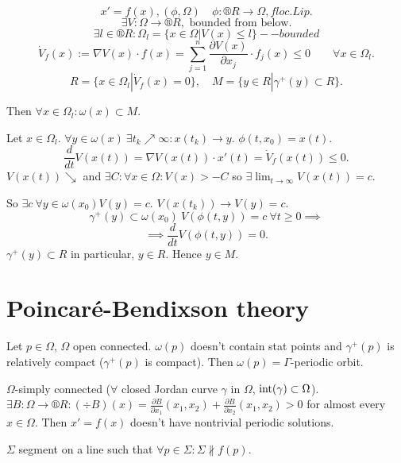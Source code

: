 \documentclass[12pt]{article}					%
\begin{document}
\begin{veta}
	$$ x' = f(x), (\phi, \Omega) \quad \phi: ®R \rightarrow \Omega, f loc. Lip. $$
	$$ \exists V: \Omega \rightarrow ®R, \text{ bounded from below}. $$
	$$ \exists l \in ®R: \Omega_l = \{x \in \Omega | V(x) ≤ l\} -- bounded $$
	$$ \dot{V}_f(x) := \nabla V(x) · f(x) = \sum_{j=1}^n  \frac{\partial V(x)}{\partial x_j}·f_j(x) ≤ 0 \qquad \forall x \in \Omega_l. $$
	$$ R = \{x \in \Omega_l | \dot{V}_f(x) = 0\}, \quad M = \{y \in R | \gamma^+(y) \subset R\}. $$

	Then $\forall x \in \Omega_l: \omega(x) \subset M$.

	\begin{dukazin}
		Let $x \in \Omega_l$. $\forall y \in \omega(x)\ \exists t_k \nearrow ∞: x(t_k) \rightarrow y$. $\phi(t, x_0) = x(t)$.
		$$ \frac{d}{dt} V(x(t)) = \nabla V(x(t))·x'(t) = \dot{V}_f(x(t)) ≤ 0. $$
		$V(x(t)) \searrow$ and $\exists C: \forall x \in \Omega: V(x) > -C$ so $\exists \lim_{t \rightarrow ∞} V(x(t)) = c$.

		So $\exists c\ \forall y \in \omega(x_0) V(y) = c$. $V(x(t_k)) \rightarrow V(y) = c$.
		$$ \gamma^+(y) \subset \omega(x_0)\ V(\phi(t, y)) = c\ \forall t ≥ 0 \implies $$
		$$ \implies \frac{d}{dt}V(\phi(t, y)) = 0. $$
		$\gamma^+(y) \subset R$ in particular, $y \in R$. Hence $y \in M$.
	\end{dukazin}
\end{veta}

\section{Poincaré-Bendixson theory}
\begin{veta}
	Let $p \in \Omega$, $\Omega$ open connected. $\omega(p)$ doesn't contain stat points and $\gamma^+(p)$ is relatively compact ($\gamma^+(p)$ is compact). Then $\omega(p) = \Gamma$-periodic orbit.
\end{veta}

\begin{veta}
	$\Omega$-simply connected ($\forall$ closed Jordan curve $\gamma$ in $\Omega$, $\operatorname{int}(\gamma) \subset \Omega$). $\exists B: \Omega \rightarrow ®R: (\div B)(x) = \frac{\partial B}{\partial x_1}(x_1, x_2) + \frac{\partial B}{\partial x_2}(x_1, x_2) > 0$ for almost every $x \in \Omega$. Then $x' = f(x)$ doesn't have nontrivial periodic solutions.
\end{veta}

\begin{definice}[Transverzála]
	$\Sigma$ segment on a line such that $\forall p \in \Sigma: \Sigma \not\parallel f(p)$.
\end{definice}
\end{document}

